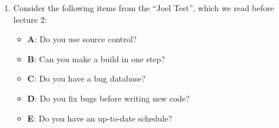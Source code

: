 \documentclass{report}
\newif\ifkey
\newcommand{\answerlong}[1]{\ifkey\color{red}\textbf{#1}\color{black}\else\vspace{0.5in}\fi\xspace}
\newcommand*{\pts}[1]{\addtocounter{points}{#1}(#1pt)}
\begin{document}
\begin{spacing}{1.4}
\begin{enumerate}[leftmargin=*]
\begin{enumerate}
    \item \pts{3} In an effort to reduce the memory footprint of a Java program, we decide to try replacing
      every \lstinline{long} variable with an \lstinline{int}. However, when we do so, our program fails some of its test cases (we suspect due to integer overflow). We want to
      identify which \lstinline{long} variables can be replaced with \lstinline{int} variables such that the program still passes all tests.\\
      \answerlong{Delta debugging is suitable for this use case. We can define script is_interesting.sh such that it takes a
        list of occurrences of long and replaces each with an int. The script exits 1 if the code compiles and runs the tests
        successfully, and it exits 0 if the code doesn't compile or fails any tests.}

    \item \pts{3} In an effort to reduce the build time of a Java program, we decide to try removing
      dependencies from our build file: the program is old, and we believe some of the dependencies are no longer used.
      However, when we do so, our program fails to compile (we suspect because some of the dependencies we removed are
      still in use). We want to identify the minimal subset of dependencies that enables our program to compile.\\
      \answerlong{Delta debugging is suitable for this use case. We can define script is_interesting.sh such that it takes a list of
        dependencies, removes them from the build file, and then attempts to compile the program. The script exits 1 if the code compiles
        successfully, and 0 if it does not.}
      
      \end{enumerate}

    \item Consider the following items from the ``Joel Test'', which we read before lecture 2:
    \begin{itemize}
      \item \textbf{A}: Do you use source control?
      \item \textbf{B}: Can you make a build in one step?
      \item \textbf{C}: Do you have a bug database?
      \item \textbf{D}: Do you fix bugs before writing new code?
      \item \textbf{E}: Do you have an up-to-date schedule?
    \end{itemize}


\end{enumerate}
\end{spacing}
\end{document}
